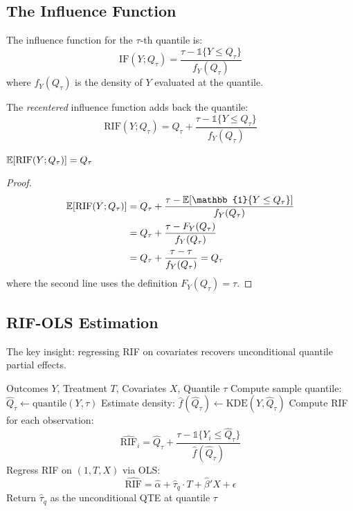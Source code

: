\subsection{The Influence Function}

The influence function for the $\tau$-th quantile is:
\[
\text{IF}(Y; Q_\tau) = \frac{\tau - \mathbb{1}\{Y \leq Q_\tau\}}{f_Y(Q_\tau)}
\]
where $f_Y(Q_\tau)$ is the density of $Y$ evaluated at the quantile.

The \emph{recentered} influence function adds back the quantile:
\[
\text{RIF}(Y; Q_\tau) = Q_\tau + \frac{\tau - \mathbb{1}\{Y \leq Q_\tau\}}{f_Y(Q_\tau)}
\]

\begin{theorem}
\label{thm:rif-expectation}
$\mathbb{E}[\text{RIF}(Y; Q_\tau)] = Q_\tau$
\end{theorem}

\begin{proof}
\begin{align*}
\E[\text{RIF}(Y; Q_\tau)] &= Q_\tau + \frac{\tau - \E[\mathbb{1}\{Y \leq Q_\tau\}]}{f_Y(Q_\tau)} \\
&= Q_\tau + \frac{\tau - F_Y(Q_\tau)}{f_Y(Q_\tau)} \\
&= Q_\tau + \frac{\tau - \tau}{f_Y(Q_\tau)} = Q_\tau
\end{align*}
where the second line uses the definition $F_Y(Q_\tau) = \tau$.
\end{proof}

\subsection{RIF-OLS Estimation}

The key insight: regressing RIF on covariates recovers unconditional quantile partial effects.

\begin{algorithm}[H]
\caption{RIF-OLS for Unconditional QTE}
\label{alg:rif-ols}
\begin{algorithmic}[1]
\REQUIRE Outcomes $Y$, Treatment $T$, Covariates $X$, Quantile $\tau$
\STATE Compute sample quantile: $\hat{Q}_\tau \gets \text{quantile}(Y, \tau)$
\STATE Estimate density: $\hat{f}(\hat{Q}_\tau) \gets \text{KDE}(Y, \hat{Q}_\tau)$
\STATE Compute RIF for each observation:
\[
\widehat{\text{RIF}}_i = \hat{Q}_\tau + \frac{\tau - \mathbb{1}\{Y_i \leq \hat{Q}_\tau\}}{\hat{f}(\hat{Q}_\tau)}
\]
\STATE Regress RIF on $(1, T, X)$ via OLS:
\[
\widehat{\text{RIF}} = \hat{\alpha} + \hat{\tau}_q \cdot T + \hat{\beta}' X + \epsilon
\]
\STATE Return $\hat{\tau}_q$ as the unconditional QTE at quantile $\tau$
\end{algorithmic}
\end{algorithm}

